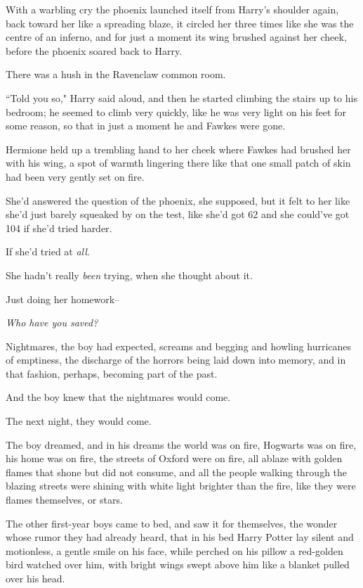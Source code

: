 With a warbling cry the phoenix launched itself from Harry's shoulder again, back toward her like a spreading blaze, it circled her three times like she was the centre of an inferno, and for just a moment its wing brushed against her cheek, before the phoenix soared back to Harry.

There was a hush in the Ravenclaw common room.

``Told you so," Harry said aloud, and then he started climbing the stairs up to his bedroom; he seemed to climb very quickly, like he was very light on his feet for some reason, so that in just a moment he and Fawkes were gone.

Hermione held up a trembling hand to her cheek where Fawkes had brushed her with his wing, a spot of warmth lingering there like that one small patch of skin had been very gently set on fire.

She'd answered the question of the phoenix, she supposed, but it felt to her like she'd just barely squeaked by on the test, like she'd got 62 and she could've got 104 if she'd tried harder.

If she'd tried at \emph{all}.

She hadn't really \emph{been} trying, when she thought about it.

Just doing her homework\---

\emph{Who have you saved?}


Nightmares, the boy had expected, screams and begging and howling hurricanes of emptiness, the discharge of the horrors being laid down into memory, and in that fashion, perhaps, becoming part of the past.

And the boy knew that the nightmares would come.

The next night, they would come.

The boy dreamed, and in his dreams the world was on fire, Hogwarts was on fire, his home was on fire, the streets of Oxford were on fire, all ablaze with golden flames that shone but did not consume, and all the people walking through the blazing streets were shining with white light brighter than the fire, like they were flames themselves, or stars.

The other first-year boys came to bed, and saw it for themselves, the wonder whose rumor they had already heard, that in his bed Harry Potter lay silent and motionless, a gentle smile on his face, while perched on his pillow a red-golden bird watched over him, with bright wings swept above him like a blanket pulled over his head.

